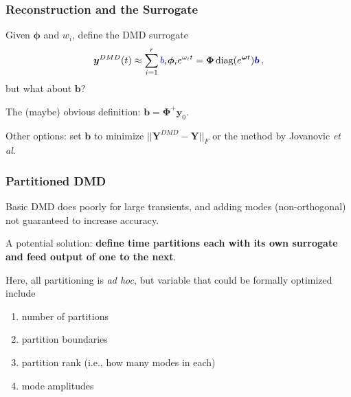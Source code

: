 \documentclass[fleqn]{beamer}
\renewcommand{\vec}[1]{\bm{#1}} %
\begin{document}
\begin{frame}
\frametitle{Reconstruction and the Surrogate}

Given $\mathbf{\phi}$ and $w_i$, define the DMD surrogate
\begin{equation*}
 \vec{y}^{DMD}(t)\approx \sum_{i=1}^{r} \textcolor{blue}{b}_i \boldsymbol{\phi}_i e^{\omega_it}={{\boldsymbol{\Phi}}} \, {\textrm{diag}}(e^{\vec{\omega}t})\vec{\textcolor{blue}{b}} \, ,
\end{equation*}
but what about $\mathbf{b}$?


\vfill 
\pause

The (maybe) obvious definition: $\mathbf{b} = \boldsymbol{\Phi}^+ \mathbf{y}_0$.

\vfill 
\pause 

Other options: set $\mathbf{b}$ to minimize $||\mathbf{Y}^{DMD} - \mathbf{Y}||_F$ or the method by Jovanovic {\it et al}.


\vfill

\end{frame}

\begin{frame}
\frametitle{Partitioned DMD}


Basic DMD does poorly for large transients, and adding modes (non-orthogonal) not guaranteed to increase accuracy.

\vfill 
\pause

A potential solution: {\bf define time partitions each with its own surrogate and feed output of one to the next}.

\vfill 
\pause

Here, all partitioning is {\it ad hoc}, but variable that could be formally optimized include
\begin{enumerate}
 \item number of partitions
 \item partition boundaries
 \item partition rank (i.e., how many modes in each)
 \item mode amplitudes
\end{enumerate}

\end{frame}


\end{document}

